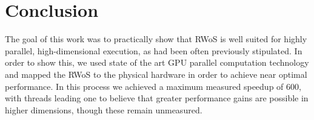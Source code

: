 \section{Conclusion}
The goal of this work was to practically show that \gls{RWoS}
is well suited for highly parallel, high-dimensional execution, as had been often previously
stipulated.
In order to show this, we used state of the art \gls{GPU} parallel computation technology
and mapped the \gls{RWoS} to the physical hardware in order to achieve near optimal performance.
In this process we achieved a maximum measured speedup of 600, with threads leading
one to believe that greater performance gains are possible in higher dimensions,
though these remain unmeasured.

